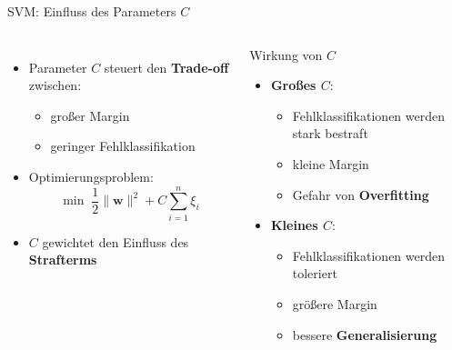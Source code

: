 \begin{frame}{SVM: Einfluss des Parameters $C$}
\begin{columns}
\begin{itemize}
  \item Parameter $C$ steuert den \textbf{Trade-off} zwischen:
  \begin{itemize}
    \item großer Margin
    \item geringer Fehlklassifikation
  \end{itemize}
  \item Optimierungsproblem:
  \[
    \min \;\frac{1}{2}\|\mathbf{w}\|^2 + C \sum_{i=1}^{n}\xi_i
  \]
  \item $C$ gewichtet den Einfluss des \textbf{Strafterms}
\end{itemize}

\begin{blockC1}{Wirkung von $C$}
\begin{itemize}
  \item \textbf{Großes $C$}:
  \begin{itemize}
    \item Fehlklassifikationen werden stark bestraft
    \item kleine Margin
    \item Gefahr von \textbf{Overfitting}
  \end{itemize}

  \item \textbf{Kleines $C$}:
  \begin{itemize}
    \item Fehlklassifikationen werden toleriert
    \item größere Margin
    \item bessere \textbf{Generalisierung}
  \end{itemize}
\end{itemize}
\end{blockC1}
\end{columns}

\end{frame}

